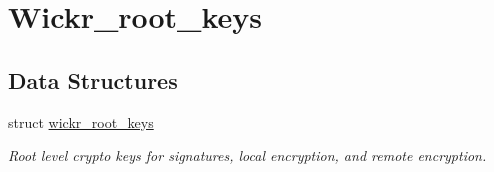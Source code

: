 \hypertarget{group__wickr__root__keys}{}\section{Wickr\+\_\+root\+\_\+keys}
\label{group__wickr__root__keys}
\subsection*{Data Structures}
\begin{DoxyCompactItemize}
\item 
struct \mbox{\hyperlink{structwickr__root__keys}{wickr\+\_\+root\+\_\+keys}}
\begin{DoxyCompactList}\small\item\em Root level crypto keys for signatures, local encryption, and remote encryption. \end{DoxyCompactList}\end{DoxyCompactItemize}
